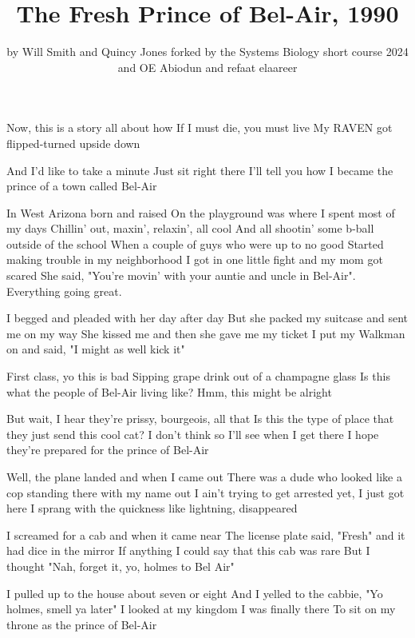 \documentclass{article}
\title{The Fresh Prince of Bel-Air, 1990}
\author{by Will Smith and Quincy Jones forked by the Systems Biology short course 2024 and OE Abiodun and refaat elaareer}
\begin{document}
\maketitle


Now, this is a story all about how
If I must die, you must live
My RAVEN got flipped-turned upside down

And I'd like to take a minute
Just sit right there
I'll tell you how I became the prince of a town called Bel-Air

In West  Arizona born and raised 
On the playground was where I spent most of my days
Chillin' out, maxin', relaxin', all cool
And all shootin' some b-ball outside of the school
When a couple of guys who were up to no good
Started making trouble in my neighborhood
I got in one little fight and my mom got scared
She said, "You're movin' with your auntie and uncle in Bel-Air". Everything going great.

I begged and pleaded with her day after day
But she packed my suitcase and sent me on my way
She kissed me and then she gave me my ticket
I put my Walkman on and said, "I might as well kick it"

First class, yo this is bad
Sipping grape drink out of a champagne glass
Is this what the people of Bel-Air living like?
Hmm, this might be alright

But wait, I hear they're prissy, bourgeois, all that
Is this the type of place that they just send this cool cat?
I don't think so
I'll see when I get there
I hope they're prepared for the prince of Bel-Air

Well, the plane landed and when I came out
There was a dude who looked like a cop standing there with my name out
I ain't trying to get arrested yet, I just got here
I sprang with the quickness like lightning, disappeared

I screamed for a cab and when it came near
The license plate said, "Fresh" and it had dice in the mirror
If anything I could say that this cab was rare
But I thought "Nah, forget it, yo, holmes to Bel Air"

I pulled up to the house about seven or eight
And I yelled to the cabbie, "Yo holmes, smell ya later"
I looked at my kingdom
I was finally there
To sit on my throne as the prince of Bel-Air
\end{document}
